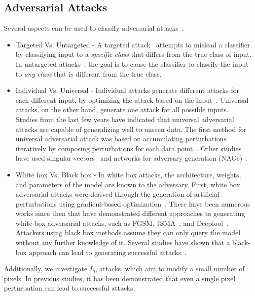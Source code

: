\documentclass[11pt]{article}
\begin{document}
\subsection{Adversarial Attacks}
Several aspects can be used to classify adversarial attacks~\cite{taxonomy}:
\begin{itemize}
    \item Targeted Vs. Untargeted - A targeted attack~\cite{papernot2015limitations} attempts to mislead a classifier by classifying input to a \textit{specific class} that differs from the true class of input. In untargeted attacks~\cite{ref7}, the goal is to cause the classifier to classify the input to \textit{any class} that is different from the true class.
    \item Individual Vs. Universal - Individual attacks generate different attacks for each different input, by optimizing the attack based on the input~\cite{ref7,papernot2015limitations,moosavidezfooli2016deepfool}. Universal attacks, on the other hand, generate one attack for all possible inputs. Studies from the last few years have indicated that universal adversarial attacks are capable of generalizing well to unseen data. The first method for universal adversarial attack was based on accumulating perturbations iteratively by composing perturbations for each data point~\cite{moosavidezfooli2017universal}. Other studies have used singular vectors~\cite{khrulkov2017art} and networks for adversary generation (NAGs)~\cite{mopuri2018nag}.
    \item White box Vs. Black box - In white box attacks, the architecture, weights, and parameters of the model are known to the adversary. First, white box adversarial attacks were derived through the generation of artificial perturbations using gradient-based optimization~\cite{szegedy2014intriguing}. There have been numerous works since then that have demonstrated different approaches to generating white-box adversarial attacks, such as FGSM\cite{ref7}, JSMA~\cite{papernot2015limitations}, and Deepfool~\cite{moosavidezfooli2016deepfool}. Attackers using black box methods assume they can only query the model without any further knowledge of it. Several studies have shown that a black-box approach can lead to generating successful attacks~\cite{BlackBox1, BlackBox2, BlackBox3, BlackBox4}.
\end{itemize}

Additionally, we investigate $L_0$ attacks, which aim to modify a small number of pixels. In previous studies, it has been demonstrated that even a single pixel perturbation can lead to successful attacks\cite{OnePixelAttack, alatalo2021chromatic, vargas2019understanding}.
\end{document}
